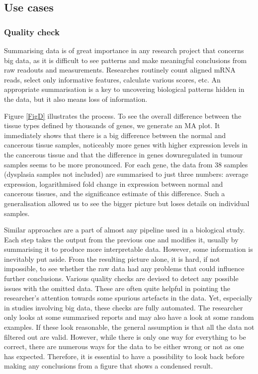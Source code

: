 \documentclass[twocolumn,10pt]{article}
\begin{document}
\subsection{Use cases}
\subsubsection{Quality check}

Summarising data is of great importance in any research project that concerns big data, as it is difficult to see patterns and make meaningful conclusions from raw readouts and measurements. Researches routinely count aligned mRNA reads, select only informative features, calculate various scores, etc. An appropriate summarisation is a key to uncovering biological patterns hidden in the data, but it also means loss of information.

Figure \ref{FigD} illustrates the process. To see the overall difference between the tissue types defined by thousands of genes, we generate an MA plot. It immediately shows that there is a big difference between the normal and cancerous tissue samples, noticeably more genes with higher expression levels in the cancerous tissue and that the difference in genes downregulated in tumour samples seems to be more pronounced. For each gene, the data from 38 samples (dysplasia samples not included) are summarised to just three numbers: average expression, logarithmised fold change in expression between normal and cancerous tissues, and the significance estimate of this difference. Such a generalisation allowed us to see the bigger picture but loses details on individual samples.

Similar approaches are a part of almost any pipeline used in a biological study. Each step takes the output from the previous one and modifies it, usually by summarising it to produce more interpretable data. However, some information is inevitably put aside. From the resulting picture alone, it is hard, if not impossible, to see whether the raw data had any problems that could influence further conclusions. Various quality checks are devised to detect any possible issues with the omitted data. These are often quite helpful in pointing the researcher's attention towards some spurious artefacts in the data. Yet, especially in studies involving big data, these checks are fully automated. The researcher only looks at some summarised reports and may also have a look at some random examples. If these look reasonable, the general assumption is that all the data not filtered out are valid. However, while there is only one way for everything to be correct, there are numerous ways for the data to be either wrong or not as one has expected. Therefore, it is essential to have a possibility to look back before making any conclusions from a figure that shows a condensed result.
\end{document}
